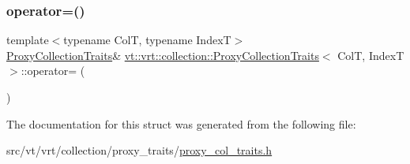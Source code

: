 \subsubsection{\texorpdfstring{operator=()}{operator=()}}
{\footnotesize\ttfamily template$<$typename ColT, typename IndexT$>$ \\
\hyperlink{structvt_1_1vrt_1_1collection_1_1_proxy_collection_traits}{Proxy\+Collection\+Traits}\& \hyperlink{structvt_1_1vrt_1_1collection_1_1_proxy_collection_traits}{vt\+::vrt\+::collection\+::\+Proxy\+Collection\+Traits}$<$ ColT, IndexT $>$\+::operator= (\begin{DoxyParamCaption}\item[{\hyperlink{structvt_1_1vrt_1_1collection_1_1_proxy_collection_traits}{Proxy\+Collection\+Traits}$<$ ColT, IndexT $>$ const \&}]{ }\end{DoxyParamCaption})\hspace{0.3cm}{\ttfamily [default]}}



The documentation for this struct was generated from the following file\+:\begin{DoxyCompactItemize}
\item 
src/vt/vrt/collection/proxy\+\_\+traits/\hyperlink{proxy__col__traits_8h}{proxy\+\_\+col\+\_\+traits.\+h}\end{DoxyCompactItemize}
